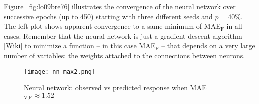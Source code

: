 \documentclass[oneside,10pt]{book}
\begin{document}
Figure~\ref{fig:lo09bre76} illustrates the convergence of the neural network over successive epochs (up to 450) starting with three different seeds and $p=40\%$.
The left plot shows apparent convergence to a same minimum of MAE$_{\text{F}}$  in all cases. Remember that the neural network is just a 
\textcolor{index}{gradient descent} algorithm [\href{https://en.wikipedia.org/wiki/Gradient_descent}{Wiki}] to minimize a function -- in this case MAE$_{\text{F}}$ -- that depends on a very large number of variables: the weights attached to the connections between neurons. 



\begin{figure}[H]
\centering
\texttt{[image: nn\_max2.png]}  
\caption{Neural network: observed vs predicted response when MAE$_{\text{V,F}}\approx 1.52$} 
\label{fig:pry998rw76}
\end{figure}
\end{document}
